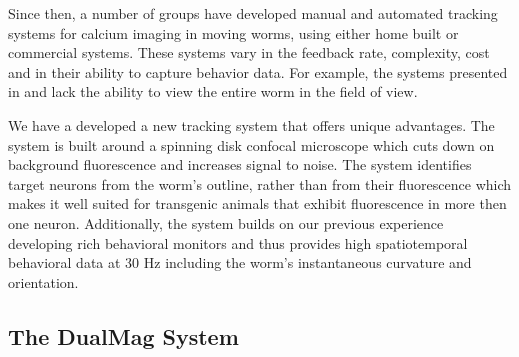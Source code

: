 Since then, a number of groups have developed manual \citep{kawano_imbalancing_2011} and automated \citep{faumont_image-free_2011, ben_arous_automated_2010, piggott_neural_2011} tracking systems for calcium imaging in moving worms, using either home built \citep{ben_arous_automated_2010, piggott_neural_2011,kawano_imbalancing_2011} or commercial \citep{faumont_image-free_2011} systems. These systems vary in the feedback rate, complexity, cost and in their ability to capture behavior data. For example, the systems presented in \citep{piggott_neural_2011} and  \citep{kawano_imbalancing_2011} lack the ability to view the entire worm in the field of view. 


We have a developed a new tracking system that offers unique advantages. The system is built around a spinning disk confocal microscope which cuts down on background fluorescence and increases signal to noise. The system identifies target neurons from the worm's outline, rather than from their fluorescence which makes it well suited for transgenic animals that exhibit fluorescence in more then one neuron. Additionally, the system builds on our previous experience developing rich behavioral monitors and thus provides high spatiotemporal behavioral data at 30 Hz including the worm's instantaneous curvature and orientation.  


\subsection{The DualMag System}

